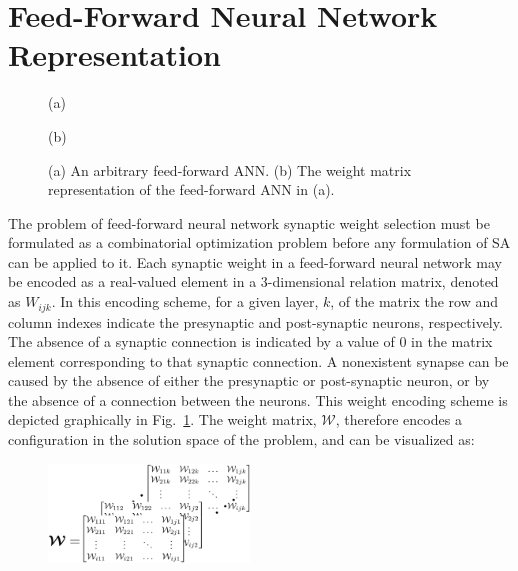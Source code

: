 \documentclass[11pt]{afthesis}
\begin{document}
	\section{Feed-Forward Neural Network Representation}
	\label{scn:feed_forward_neural_network_representation}
	\begin{figure}
		
		\begin{minipage}[b]{0.48\linewidth}
			\centering
			\centerline{}
			\centerline{(a)}\medskip
		\end{minipage}
		\hfill
		\begin{minipage}[b]{0.48\linewidth}
			\centering
			\centerline{}
			\centerline{(b)}\medskip
		\end{minipage}
		\caption{
			(a) An arbitrary feed-forward ANN.
			(b) The weight matrix representation of the feed-forward ANN in (a).}
		\label{fig:nettomatmapping}
	\end{figure}
	
	 The problem of feed-forward neural network synaptic weight selection must be formulated as a combinatorial optimization problem before any formulation of SA can be applied to it. Each synaptic weight in a feed-forward neural network may be encoded as a real-valued element in a 3-dimensional relation matrix, denoted as $\mathit{W}_{ijk}$. In this encoding scheme, for a given layer, $k$, of the matrix the row and column indexes indicate the presynaptic and post-synaptic neurons, respectively. The absence of a synaptic connection is indicated by a value of $0$ in the matrix element corresponding to that synaptic connection. A nonexistent synapse can be caused by the absence of either the presynaptic or post-synaptic neuron, or by the absence of a connection between the neurons. This weight encoding scheme is depicted graphically in Fig.~\ref{fig:nettomatmapping}. The weight matrix, $\boldsymbol{\mathcal{W}}$, therefore encodes a configuration in the solution space of the problem, and can be visualized as:
	 
	 \begin{figure}[ht!]
	 	\begin{center}
	 		\includegraphics[width = 2.1in]{figures/abstract_matrix_rep.eps}
	 		\label{fig:abstract_matrix_rep}
	 	\end{center}
	 \end{figure}
	 
\end{document}
